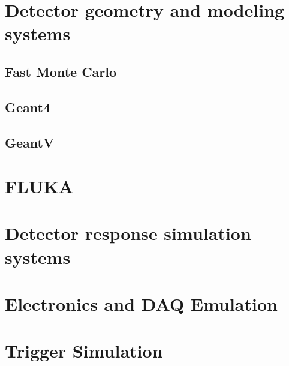 \section{Detector geometry and modeling systems}


\subsection{Fast Monte Carlo}

\subsection{Geant4}

\subsection{GeantV}

\section{FLUKA}

\section{Detector response simulation systems}

\section{Electronics and DAQ Emulation}

\section{Trigger Simulation}
